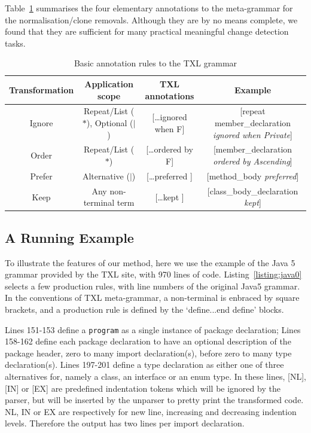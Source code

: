 \documentclass[10pt, conference, compsocconf]{IEEEtran}
\begin{document}
Table~\ref{table:rule} summarises the four elementary annotations to the meta-grammar for the normalisation/clone removals. Although they are by no means complete, we found that they are sufficient for many practical meaningful change detection tasks.
\begin{table}\centering
\caption{Basic annotation rules to the TXL grammar}\label{table:rule}
\begin{tabular}{|c|c|c|c|}\hline
Transformation & Application scope & TXL annotations & Example \\\hline\hline
Ignore & Repeat/List ($*$), Optional ($|$) & [\ldots ignored when F] & [repeat member\_declaration \emph{ignored when Private}]\\\hline\hline 
Order & Repeat/List ($*$) & [\ldots ordered by F] & [member\_declaration \emph{ordered by Ascending}] \\\hline\hline
Prefer & Alternative ($|$) & [\ldots preferred ] & [method\_body \emph{preferred}] \\\hline\hline
Keep & Any non-terminal term & [\ldots kept ] & [class\_body\_declaration \emph{kept}] \\\hline
\hline\end{tabular}
\end{table}

\subsection{A Running Example}\label{sec:example}
To illustrate the features of our method, here we use the example of the Java 5 grammar provided by the TXL site, with 970 lines of code. Listing~\ref{listing:java0} selects a few production rules, with line numbers of the original Java5 grammar. In the conventions of TXL meta-grammar, a non-terminal is enbraced by square brackets, and a production rule is defined by the `define...end define' blocks.

Lines 151-153 define a {\tt program} as a single instance of package declaration; Lines 158-162 define each package declaration to have an optional description of the package header, zero to many import declaration(s), before zero to many type declaration(s). Lines 197-201 define a type declaration as either one of three alternatives for, namely a class, an interface or an enum type. In these lines, [NL], [IN] or [EX] are predefined indentation tokens which will be ignored by the parser, but will be inserted by the unparser to pretty print the transformed code.  NL, IN or EX are respectively for new line, increasing and decreasing indention levels. Therefore the output has two lines per import declaration. 
\end{document}
